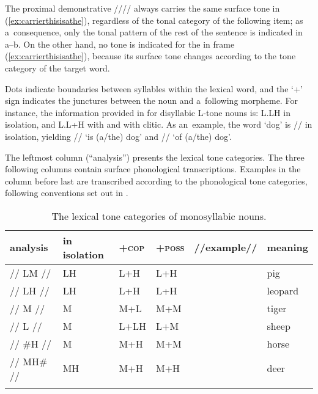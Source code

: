 {{{{{The proximal demonstrative //// always carries the same surface tone in (\ref{ex:carrierthisisathe}), regardless of the tonal category
of the following item; as a~consequence, only the tonal pattern of the rest of the sentence is
indicated in
a--b. On the other hand, no
tone is indicated for the  in frame (\ref{ex:carrierthisisathe}), because its surface tone changes according to the
tone category of the target word.

Dots indicate boundaries between syllables within the lexical word, and the ‘+’ sign indicates the
junctures between the noun and a~following morpheme. For instance, the information provided in
 for disyllabic L-tone nouns is: L.LH in
isolation, and L.L+H with  and with  clitic. As an~example, the word ‘dog’ is
// in isolation, yielding // ‘is \mbox{(a/the)} dog’ and
// ‘of \mbox{(a/the)} dog’. 

The leftmost column (“analysis”) presents the lexical tone categories. The three following columns contain
surface phonological transcriptions. Examples in the column before last are transcribed according to
the phonological tone categories, following conventions set out in .

\begin{subtables}
\label{tab:thelexicaltonesofmonosyllabicanddisyllabicnouns}
\begin{table}[t!]
\caption{\label{tab:thelexicaltonesofmonosyllabicnouns}The lexical tone categories of monosyllabic nouns.}
\begin{tabularx}{\textwidth}{ P{20mm} P{19mm} Q Q P{19mm} Q }
  \lsptoprule
analysis & in isolation & +\textsc{cop} & +\textsc{poss} & //example// & meaning\\ \midrule
// LM // & LH & L+H & L+H &   & pig\\
// LH // & LH & L+H & L+H &   & leopard\\
// M // & M & M+L & M+M &  & tiger\\
// L // & M & L+LH & L+M &  & sheep\\
// \#H // & M & M+H & M+M &  & horse\\
// MH\# // & MH & M+H & M+H &  & deer\\
\lspbottomrule
\end{tabularx}
\end{table}


\end{subtables}}}}}}
